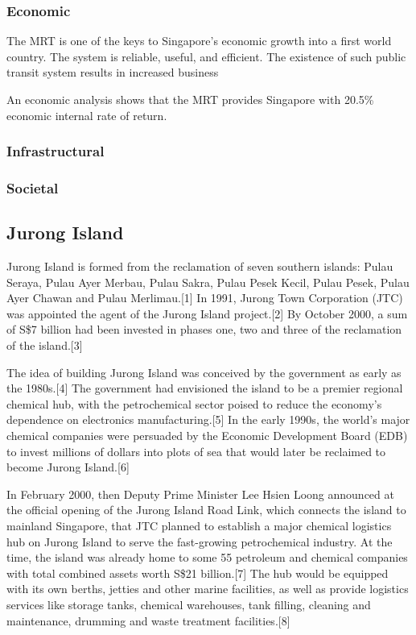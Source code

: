 \documentclass[a4paper,10pt]{article}
\begin{document}
\subsubsection{Economic}
The MRT is one of the keys to Singapore's economic growth into a first world country. The system is reliable, useful, and efficient. The existence of such public transit system results in increased business

An economic analysis\cite{fouracre1993mass} shows that the MRT provides Singapore with 20.5\% economic internal rate of return.

\subsubsection{Infrastructural}

\subsubsection{Societal}

\subsection{Jurong Island}
Jurong Island is formed from the reclamation of seven southern islands: Pulau Seraya, Pulau Ayer Merbau, Pulau Sakra, Pulau Pesek Kecil, Pulau Pesek, Pulau Ayer Chawan and Pulau Merlimau.[1] In 1991, Jurong Town Corporation (JTC) was appointed the agent of the Jurong Island project.[2] By October 2000, a sum of S\$7 billion had been invested in phases one, two and three of the reclamation of the island.[3]

The idea of building Jurong Island was conceived by the government as early as the 1980s.[4] The government had envisioned the island to be a premier regional chemical hub, with the petrochemical sector poised to reduce the economy’s dependence on electronics manufacturing.[5] In the early 1990s, the world’s major chemical companies were persuaded by the Economic Development Board (EDB) to invest millions of dollars into plots of sea that would later be reclaimed to become Jurong Island.[6]
 
In February 2000, then Deputy Prime Minister Lee Hsien Loong announced at the official opening of the Jurong Island Road Link, which connects the island to mainland Singapore, that JTC planned to establish a major chemical logistics hub on Jurong Island to serve the fast-growing petrochemical industry.  At the time, the island was already home to some 55 petroleum and chemical companies with total combined assets worth S\$21 billion.[7] The hub would be equipped with its own berths, jetties and other marine facilities, as well as provide logistics services like storage tanks, chemical warehouses, tank filling, cleaning and maintenance, drumming and waste treatment facilities.[8]
\end{document}
